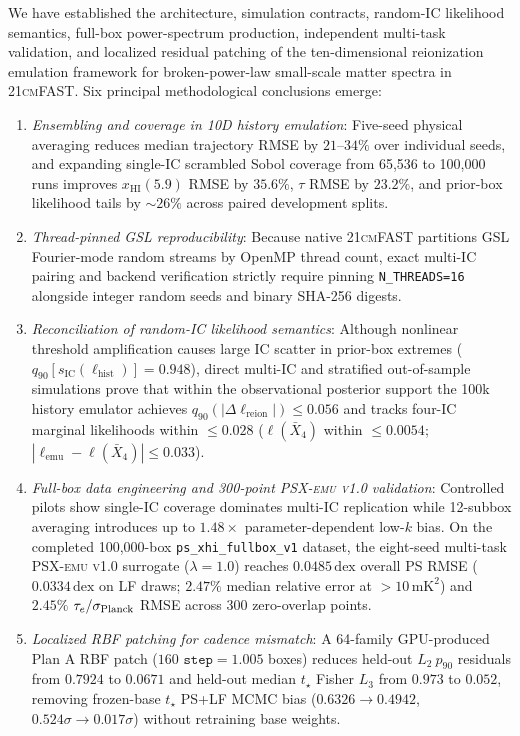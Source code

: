 \documentclass[aps,prd,reprint,superscriptaddress,nofootinbib,amsmath,amssymb,floatfix,longbibliography]{revtex4-2}
\begin{document}
We have established the architecture, simulation contracts, random-IC likelihood semantics, full-box power-spectrum production, independent multi-task validation, and localized residual patching of the ten-dimensional reionization emulation framework for broken-power-law small-scale matter spectra in \textsc{21cmFAST}. Six principal methodological conclusions emerge:
\begin{enumerate}
\item \emph{Ensembling and coverage in 10D history emulation}: Five-seed physical averaging reduces median trajectory RMSE by $21\text{--}34\%$ over individual seeds, and expanding single-IC scrambled Sobol coverage from 65,536 to 100,000 runs improves $x_{\mathrm{HI}}(5.9)$ RMSE by $35.6\%$, $\tau$ RMSE by $23.2\%$, and prior-box likelihood tails by $\sim 26\%$ across paired development splits.
\item \emph{Thread-pinned GSL reproducibility}: Because native \textsc{21cmFAST} partitions GSL Fourier-mode random streams by OpenMP thread count, exact multi-IC pairing and backend verification strictly require pinning \texttt{N\_THREADS=16} alongside integer random seeds and binary SHA-256 digests.
\item \emph{Reconciliation of random-IC likelihood semantics}: Although nonlinear threshold amplification causes large IC scatter in prior-box extremes ($q_{90}[s_{\mathrm{IC}}(\ell_{\mathrm{hist}})] = 0.948$), direct multi-IC and stratified out-of-sample simulations prove that within the observational posterior support the 100k history emulator achieves $q_{90}(|\Delta\ell_{\mathrm{reion}}|) \le 0.056$ and tracks four-IC marginal likelihoods within $\le 0.028$ ($\ell(\bar{X}_4)$ within $\le 0.0054$; $|\ell_{\mathrm{emu}}-\ell(\bar{X}_4)| \le 0.033$).
\item \emph{Full-box data engineering and 300-point \textsc{PSX-emu v1.0} validation}: Controlled pilots show single-IC coverage dominates multi-IC replication while 12-subbox averaging introduces up to $1.48\times$ parameter-dependent low-$k$ bias. On the completed 100,000-box \texttt{ps\_xhi\_fullbox\_v1} dataset, the eight-seed multi-task \textsc{PSX-emu v1.0} surrogate ($\lambda=1.0$) reaches $0.0485\,\mathrm{dex}$ overall PS RMSE ($0.0334\,\mathrm{dex}$ on LF draws; $2.47\%$ median relative error at $>10\,\mathrm{mK}^2$) and $2.45\%$ $\tau_e/\sigma_{\rm Planck}$ RMSE across 300 zero-overlap points.
\item \emph{Localized RBF patching for cadence mismatch}: A 64-family GPU-produced Plan A RBF patch ($160$ $\texttt{step}=1.005$ boxes) reduces held-out $L_2\ p_{90}$ residuals from $0.7924$ to $0.0671$ and held-out median $t_\star$ Fisher $L_3$ from $0.973$ to $0.052$, removing frozen-base $t_\star$ PS+LF MCMC bias ($0.6326 \to 0.4942$, $0.524\sigma \to 0.017\sigma$) without retraining base weights.

\end{enumerate}
\end{document}
